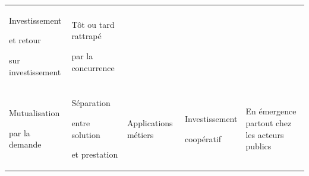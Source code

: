 \begin{jazztable*}
\begin{tabularx}{\linewidth}{YYYYY}
	Investissement\par et retour\par sur investissement & 
	Tôt ou tard rattrapé\par par la concurrence \\
	Mutualisation\par par la demande & 
	Séparation\par entre solution\par et prestation & 
	Applications métiers & 
	Investissement\par coopératif &
	En émergence partout chez les acteurs publics
\end{tabularx}%
\endgroup
\end{jazztable*}

